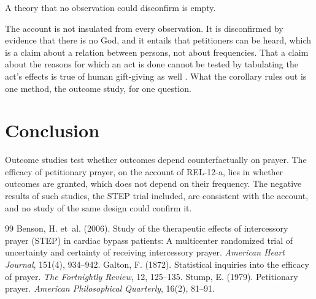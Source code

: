 \documentclass{situationist-preprint}
\begin{document}
\begin{objection}
A theory that no observation could disconfirm is empty.
\end{objection}

\begin{reply}
The account is not insulated from every observation. It is disconfirmed by evidence that there is no God, and it entails that petitioners can be heard, which is a claim about a relation between persons, not about frequencies. That a claim about the reasons for which an act is done cannot be tested by tabulating the act's effects is true of human gift-giving as well \citep{Stump1979}. What the corollary rules out is one method, the outcome study, for one question.
\end{reply}

\section{Conclusion}

Outcome studies test whether outcomes depend counterfactually on prayer. The efficacy of petitionary prayer, on the account of REL-12-a, lies in whether outcomes are granted, which does not depend on their frequency. The negative results of such studies, the STEP trial included, are consistent with the account, and no study of the same design could confirm it.

\begin{thebibliography}{99}\small
{} Benson, H. et~al. (2006). Study of the therapeutic effects of intercessory prayer (STEP) in cardiac bypass patients: A multicenter randomized trial of uncertainty and certainty of receiving intercessory prayer. \emph{American Heart Journal}, 151(4), 934--942.
 Galton, F. (1872). Statistical inquiries into the efficacy of prayer. \emph{The Fortnightly Review}, 12, 125--135.
 Stump, E. (1979). Petitionary prayer. \emph{American Philosophical Quarterly}, 16(2), 81--91.
\end{thebibliography}
\end{document}
